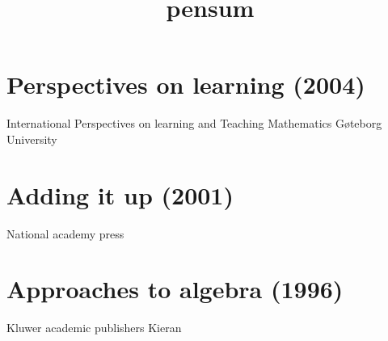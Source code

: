 \documentclass[11pt]{article}
\date{}
\title{pensum}
\begin{document}
\maketitle


\section{Perspectives on learning (2004)}
\label{sec-1}
International Perspectives on learning and Teaching Mathematics
Gøteborg University

\section{Adding it up (2001)}
\label{sec-2}
National academy press

\section{Approaches to algebra (1996)}
\label{sec-3}
Kluwer academic publishers
Kieran
\end{document}
